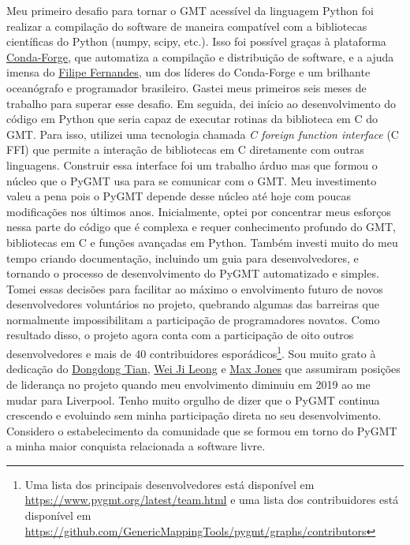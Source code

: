\documentclass[12pt,a4paper,oneside]{book}
\begin{document}
Meu primeiro desafio para tornar o GMT acessível da linguagem Python foi
realizar a compilação do software de maneira compatível com a bibliotecas
científicas do Python (numpy, scipy, etc.).
Isso foi possível graças à plataforma
\href{https://conda-forge.org/}{Conda-Forge}, que automatiza a compilação e
distribuição de software, e a ajuda imensa do
\href{https://github.com/ocefpaf}{Filipe Fernandes}, um dos líderes do
Conda-Forge e um brilhante oceanógrafo e programador brasileiro.
Gastei meus primeiros seis meses de trabalho para superar esse desafio.
Em seguida, dei início ao desenvolvimento do código em Python que seria capaz
de executar rotinas da biblioteca em C do GMT.
Para isso, utilizei uma tecnologia chamada \textit{C foreign function
interface} (C FFI) que permite a interação de bibliotecas em C diretamente com
outras linguagens.
Construir essa interface foi um trabalho árduo mas que formou o núcleo que o
PyGMT usa para se comunicar com o GMT.
Meu investimento valeu a pena pois o PyGMT depende desse núcleo até hoje com
poucas modificações nos últimos anos.
Inicialmente, optei por concentrar meus esforços nessa parte do código que é
complexa e requer conhecimento profundo do GMT, bibliotecas em C e funções
avançadas em Python.
Também investi muito do meu tempo criando documentação, incluindo um guia para
desenvolvedores, e tornando o processo de desenvolvimento do PyGMT
automatizado e simples.
Tomei essas decisões para facilitar ao máximo o envolvimento futuro de novos
desenvolvedores voluntários no projeto, quebrando algumas das barreiras que
normalmente impossibilitam a participação de programadores novatos.
Como resultado disso, o projeto agora conta com a participação de oito outros
desenvolvedores e mais de 40 contribuidores esporádicos\footnote{Uma lista dos
principais desenvolvedores está disponível em \url{https://www.pygmt.org/latest/team.html}
e uma lista dos contribuidores está disponível em \url{https://github.com/GenericMappingTools/pygmt/graphs/contributors}}.
Sou muito grato à dedicação do
\href{https://github.com/seisman}{Dongdong Tian},
\href{https://weiji14.github.io/}{Wei Ji Leong} e
\href{https://github.com/maxrjones}{Max Jones}
que assumiram posições de liderança no projeto quando meu envolvimento diminuiu
em 2019 ao me mudar para Liverpool.
Tenho muito orgulho de dizer que o PyGMT continua crescendo e evoluindo sem
minha participação direta no seu desenvolvimento.
Considero o estabelecimento da comunidade que se formou em torno do PyGMT a
minha maior conquista relacionada a software livre.
\end{document}
